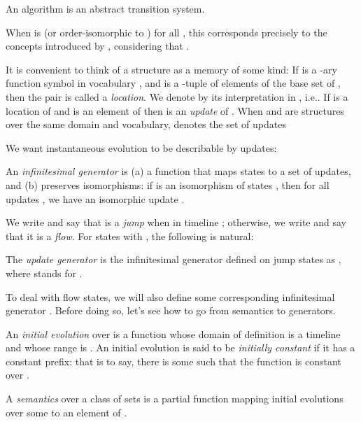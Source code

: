 \documentclass[envcountsame]{llncs}
\newcommand{\itm}[1]{\mbox{\rm(}#1\mbox{\rm)}}
\newcommand{\nd}[1]{#1}\let\ep\endproof
\renewcommand{\endproof}{\qed\ep}
\begin{document}
\begin{postulatep} \label{postulateats} An
  algorithm is an abstract
  transition system.
\end{postulatep}

When  is  (or order-isomorphic to ) for all , this corresponds precisely to the concepts
 introduced by \cite{Gur00}, considering that .






It is convenient to think of a structure  as a memory of some kind: If
 is a -ary function symbol in vocabulary , and
 is a -tuple of elements of the base set of , then
the pair  is called a
\emph{location}. We denote by  its interpretation
in , i.e.\@ .
If  is a
location of  and  is an element of  then
 is an \emph{update} of .
When  and  are structures over the same domain and vocabulary,
 denotes the set of updates 


We want instantaneous evolution to be describable by updates:


\begin{definition} \label{defmachin}
An \emph{infinitesimal generator}   is \itm{a} a function  that  maps states  to a set  of updates,
and \itm{b} preserves
  isomorphisms: if  is an isomorphism of states
  , then for all updates
  , we have an isomorphic update
  .
\end{definition}



\nd{We write  and say that  is a \emph{jump} when   in
timeline
; otherwise, we write  and say that it is a \emph{flow}.}
For states  with
, the following is natural:


\begin{definition} \label{defupdate}
The \emph{update generator} is the infinitesimal generator defined on
jump states  as
, where  stands for
.
\end{definition}


To deal with flow states, we will also define some corresponding infinitesimal
generator . Before doing so, let's see  how to go from semantics to
generators.




An \emph{initial evolution} over  is a function whose
domain of definition is a timeline and whose range is . An initial evolution is said to be \emph{initially constant} if it has
a constant prefix: that is to say, there is some  such that
the function is constant over .


\begin{definition}[Semantics]
A \emph{semantics}  over a class  of sets 
is a partial function mapping
initial evolutions over some 
to an element of .
\end{definition}
\end{document}
